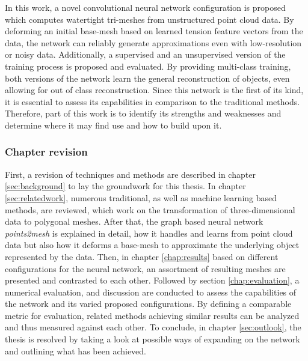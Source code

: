   In this work, a novel convolutional neural network configuration is proposed which computes watertight tri-meshes from unstructured point cloud data.
  By deforming an initial base-mesh based on learned tension feature vectors from the data, the network can reliably generate approximations
  even with low-resolution or noisy data. Additionally, a supervised and an unsupervised version of the training process is proposed and evaluated. 
  By providing multi-class training, both versions of the network learn the general reconstruction of objects, even allowing for out of class reconstruction.
  Since this network is the first of its kind, it is essential to assess its capabilities in comparison to the traditional methods. 
  Therefore, part of this work is to identify its strengths and weaknesses and determine where it may find use and how to build upon it.

  \subsubsection*{Chapter revision}
  First, a revision of techniques and methods are described in chapter \ref{sec:background} to lay the groundwork for this thesis. In chapter \ref{sec:relatedwork}, 
  numerous traditional, as well as machine learning based methods, are reviewed, which work on the transformation of three-dimensional data to polygonal
  meshes.
  After that, the graph based neural network \emph{points2mesh} is explained in detail, how it handles and learns from point cloud data but also how
   it deforms a base-mesh to approximate the underlying object represented by the data.
  Then, in chapter \ref{chap:results} based on different configurations for the neural network, an assortment of resulting meshes are presented and
   contrasted to each other.
  Followed by section \ref{chap:evaluation}, a numerical evaluation, and discussion are conducted to assess the capabilities of the network and its 
  varied proposed configurations. By defining a comparable metric for evaluation, related methods achieving similar results can be analyzed and thus 
  measured against each other.
  To conclude, in chapter \ref{sec:outlook}, the thesis is resolved by taking a look at possible ways of expanding on the network and outlining what
   has been achieved.
  